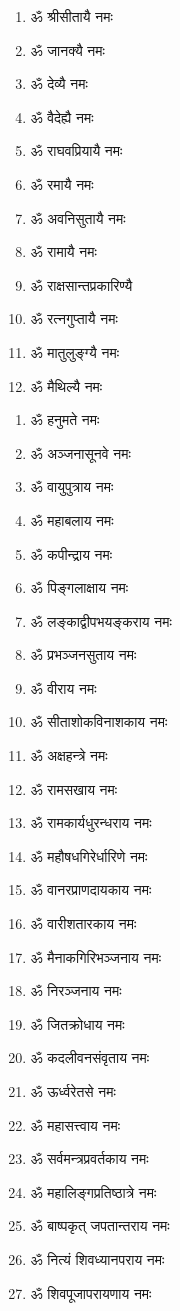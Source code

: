 \begin{center}

\begin{multicols}{2}
\begin{enumerate}
\item ॐ श्रीसीतायै नमः
\item ॐ जानक्यै नमः
\item ॐ देव्यै नमः
\item ॐ वैदेह्यै नमः
\item ॐ राघवप्रियायै नमः
\item ॐ रमायै नमः
\item ॐ अवनिसुतायै नमः
\item ॐ रामायै नमः
\item ॐ राक्षसान्तप्रकारिण्यै
\item ॐ रत्नगुप्तायै नमः
\item ॐ मातुलुङ्ग्यै नमः
\item ॐ मैथिल्यै नमः
\end{enumerate}
\end{multicols}


\begin{enumerate}
\item ॐ हनुमते नमः
\item ॐ अञ्जनासूनवे नमः
\item ॐ वायुपुत्राय नमः
\item ॐ महाबलाय नमः
\item ॐ कपीन्द्राय नमः
\item ॐ पिङ्गलाक्षाय नमः
\item ॐ लङ्काद्वीपभयङ्कराय नमः
\item ॐ प्रभञ्जनसुताय नमः
\item ॐ वीराय नमः
\item ॐ सीताशोकविनाशकाय नमः
\item ॐ अक्षहन्त्रे नमः
\item ॐ रामसखाय नमः
\item ॐ रामकार्यधुरन्धराय नमः
\item ॐ महौषधगिरेर्धारिणे नमः
\item ॐ वानरप्राणदायकाय नमः
\item ॐ वारीशतारकाय नमः
\item ॐ मैनाकगिरिभञ्जनाय नमः
\item ॐ निरञ्जनाय नमः
\item ॐ जितक्रोधाय नमः
\item ॐ कदलीवनसंवृताय नमः
\item ॐ ऊर्ध्वरेतसे नमः
\item ॐ महासत्त्वाय नमः
\item ॐ सर्वमन्त्रप्रवर्तकाय नमः
\item ॐ महालिङ्गप्रतिष्ठात्रे नमः
\item ॐ बाष्पकृत् जपतान्तराय नमः
\item ॐ नित्यं शिवध्यानपराय नमः
\item ॐ शिवपूजापरायणाय नमः
\end{enumerate}


\end{center}
